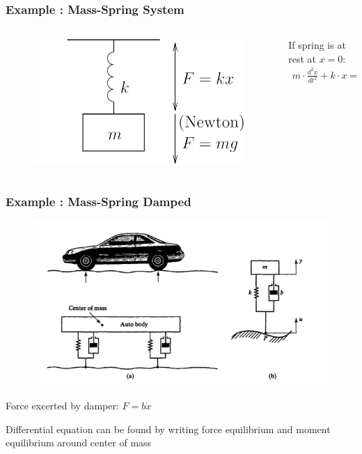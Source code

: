 \begin{frame}
	\frametitle{Example : Mass-Spring System} 
	
	\begin{columns}
		\begin{column}{0.4\linewidth}
			\begin{figure}
			\centering
			\includegraphics[width=1\linewidth]{img/mass-spring}
			\label{fig:mass-spring}
			\end{figure}
		\end{column}
		\begin{column}{0.6\linewidth}
			If spring is at rest at $x=0$:
			\begin{align*}
			m \cdot \frac{d^{2}x}{dt^{2}} + k \cdot x =  m \cdot g \\
			\end{align*}
		\end{column}
	\end{columns}
\end{frame}


\begin{frame}
	\frametitle{Example : Mass-Spring Damped}
	\begin{figure}
		\centering
		\includegraphics[width=1\linewidth]{img/mass-spring-damped}
		\label{fig:mass-spring-damped}
	\end{figure}
	Force excerted by damper: $F = b\dot{x}$
	
	Differential equation can be found by writing force equilibrium and moment equilibrium around center of mass
	
\end{frame}

